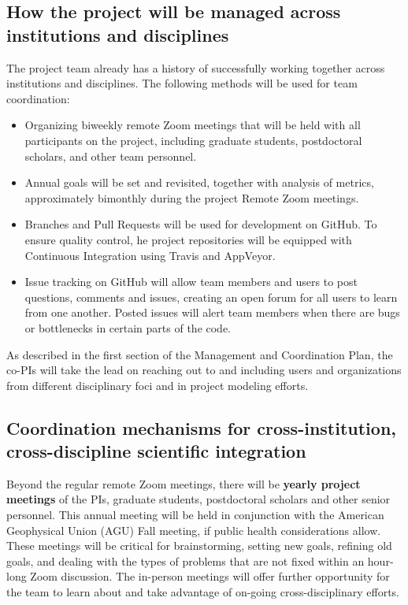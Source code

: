 \subsection*{How the project will be managed across institutions and disciplines}
The project team already has a history of successfully working together across institutions and disciplines.  The following methods will be used for team coordination:
 
\begin{itemize}
\item Organizing biweekly remote Zoom meetings that will be held with all participants on the project, including graduate students, postdoctoral scholars, and other team personnel.
\item Annual goals will be set and revisited, together with analysis of metrics, approximately bimonthly during the project Remote Zoom meetings.
\item Branches and Pull Requests will be used for development on GitHub. To ensure quality control, he project repositories will be equipped with Continuous Integration using Travis and AppVeyor. %
\item Issue tracking on GitHub will allow team members and users to post questions, comments and issues, creating an open forum for all users to learn from one another.  Posted issues will alert team members when there are bugs or bottlenecks in certain parts of the code.
\end{itemize}
As described in the first section of the Management and Coordination Plan, the co-PIs will take the lead on reaching out to and including users and organizations from different disciplinary foci and in project modeling efforts. %

\subsection*{Coordination mechanisms for cross-institution, cross-discipline scientific integration}
Beyond the regular remote Zoom meetings, there will be \textbf{yearly project meetings} of the PIs, graduate students, postdoctoral scholars and other senior personnel.  This annual meeting will be held in conjunction with the American Geophysical Union (AGU) Fall meeting, if public health considerations allow.  These meetings will be critical for brainstorming, setting new goals, refining old goals, and dealing with the types of problems that are not fixed within an hour-long Zoom discussion.  The in-person meetings will offer further opportunity for the team to learn about and take advantage of on-going cross-disciplinary efforts.
 
